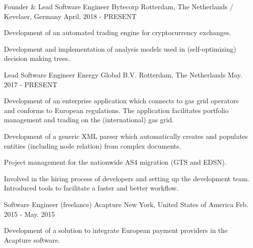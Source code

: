 

\begin{cventries}

  \cventry
    {Founder \& Lead Software Engineer} %
    {Bytecorp} %
    {Rotterdam, The Netherlands / Kevelaer, Germany} %
    {April. 2018 - PRESENT} %
    {
      \begin{cvitems} %
        \item {Development of an automated trading engine for cryptocurrency exchanges.}
        \item {Development and implementation of analysis models used in (self-optimizing) decision making trees.}
      \end{cvitems}
    }

  \cventry
    {Lead Software Engineer} %
    {Energy Global B.V.} %
    {Rotterdam, The Netherlands} %
    {May. 2017 - PRESENT} %
    {
      \begin{cvitems} %
      	\item {Development of an enterprise application which connects to gas grid operators and conforms to European regulations. \newline The application facilitates portfolio management and trading on the (international) gas grid.}
        \item {Development of a generic XML parser which automatically creates and populates entities (including node relation) from complex documents.}
        \item {Project management for the nationwide AS4 migration (GTS and EDSN).}
        \item {Involved in the hiring process of developers and setting up the development team. Introduced tools to facilitate a faster and better workflow.}
      \end{cvitems}
    }

  \cventry
    {Software Engineer (freelance)} %
    {Acapture} %
    {New York, United States of America} %
    {Feb. 2015 - May. 2015} %
    {
      \begin{cvitems} %
        \item {Development of a solution to integrate European payment providers in the Acapture software.}
      \end{cvitems}
    }
  

\end{cventries}

